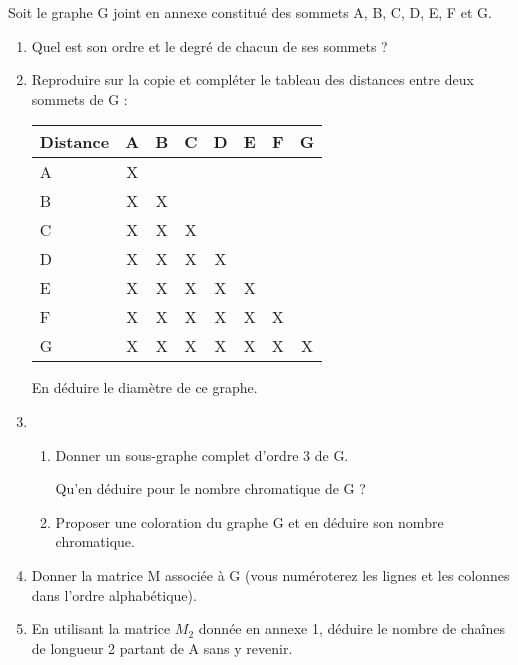 \documentclass[]{prof}
\begin{document}

Soit le graphe G joint en annexe constitué des sommets A, B, C, D, E, F et G.

\begin{enumerate} 
\item Quel est son ordre et le degré de chacun de ses sommets ?
\item Reproduire sur la copie et compléter le tableau des distances entre deux sommets de G :

\medskip
\begin{center} 
 \begin{tabular}{|l|c|c|c|c|c|c|c|}\hline
 Distance    &    A  &   B   &   C   &   D   &   E   &   F   &   G   \\ \hline
 A           &    X  &       &       &       &       &       &       \\ \hline
 B           &    X  &   X   &       &       &       &       &       \\ \hline
 C           &    X  &   X   &   X   &       &       &       &       \\ \hline
 D           &    X  &   X   &   X   &   X   &       &       &       \\ \hline
 E           &    X  &   X   &   X   &   X   &   X   &       &       \\ \hline
 F           &    X  &   X   &   X   &   X   &   X   &   X   &       \\ \hline
 G           &    X  &   X   &   X   &   X   &   X   &   X   &   X   \\ \hline
 \end{tabular}
\end{center}

\medskip
En déduire le diamètre de ce graphe.
\item 
   \begin{enumerate} 
   \item Donner un sous-graphe complet d'ordre 3 de G.

Qu'en déduire pour le nombre chromatique de G ?
   \item Proposer une coloration du graphe G et en déduire son nombre chromatique.
   \end{enumerate}
\item Donner la matrice M associée à G (vous numéroterez les lignes et les  colonnes dans l'ordre alphabétique).
\item En utilisant la matrice $ M_2$ donnée en annexe 1, déduire le nombre de chaînes de longueur 2 partant de A sans y revenir.
\end{enumerate}
\end{document}
